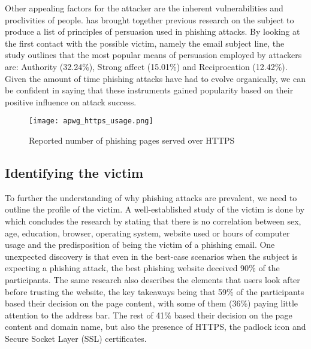 Other appealing factors for the attacker are the inherent vulnerabilities and proclivities of people. \cite{Ana_Ferreira} has brought together previous research on the subject to produce a list of principles of persuasion used in phishing attacks. By looking at the first contact with the possible victim, namely the email subject line, the study outlines that the most popular means of persuasion employed by attackers are: Authority (32.24\%), Strong affect (15.01\%) and Reciprocation (12.42\%). Given the amount of time phishing attacks have had to evolve organically, we can be confident in saying that these instruments gained popularity based on their positive influence on attack success.

\begin{figure}[!b]
	\centering
	\texttt{[image: apwg\_https\_usage.png]}
	\caption{
		Reported number of phishing pages served over HTTPS \citep{APWG_Q42019}}
	\label{fig:HTTPS_USAGE}
\end{figure}


\subsection{Identifying the victim}
\label{subsec:identifying_the_victim}
To further the understanding of why phishing attacks are prevalent, we need to outline the profile of the victim. A well-established study of the victim is done by \cite{Rachna_Dhamija} which concludes the research by stating that there is no correlation between sex, age, education, browser, operating system, website used or hours of computer usage and the predisposition of being the victim of a phishing email. One unexpected discovery is that even in the best-case scenarios when the subject is expecting a phishing attack, the best phishing website deceived 90\% of the participants. The same research also describes the elements that users look after before trusting the website, the key takeaways being that 59\% of the participants based their decision on the page content, with some of them (36\%) paying little attention to the address bar. The rest of 41\% based their decision on the page content and domain name, but also the presence of HTTPS, the padlock icon and Secure Socket Layer (SSL) certificates.

